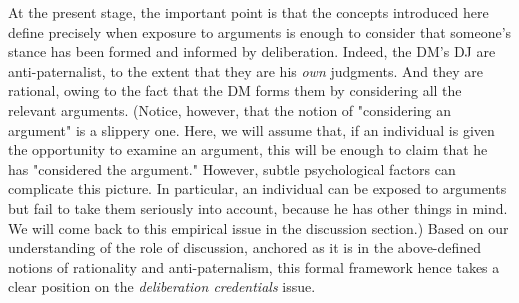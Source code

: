 \documentclass[version=3.21, pagesize, twoside=off, bibliography=totoc, DIV=calc, fontsize=12pt, a4paper, french, english]{scrartcl}
\begin{document}
At the present stage, the important point is that the concepts introduced here define precisely when exposure to arguments is enough to consider that someone’s stance has been formed and informed by deliberation. Indeed, the \ac{DM}'s \ac{DJ} are anti-paternalist, to the extent that they are his \emph{own} judgments. And they are rational, owing to the fact that the \ac{DM} forms them by considering all the relevant arguments. (Notice, however, that the notion of "considering an argument" is a slippery one. Here, we will assume that, if an individual is given the opportunity to examine an argument, this will be enough to claim that he has "considered the argument." However, subtle psychological factors can complicate this picture. In particular, an individual can be exposed to arguments but fail to take them seriously into account, because he has other things in mind. We will come back to this empirical issue in the discussion section.) Based on our understanding of the role of discussion, anchored as it is in the above-defined notions of rationality and anti-paternalism, this formal framework hence takes a clear position on the \emph{deliberation credentials} issue.  


\end{document}
